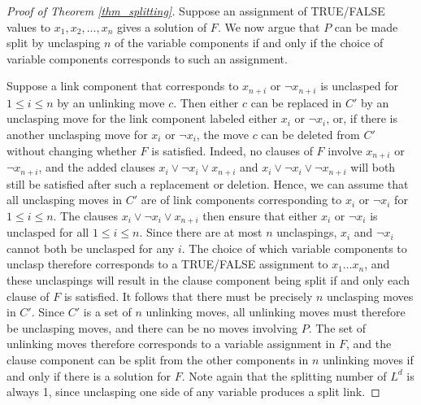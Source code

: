 \documentclass[12pt]{amsart}
\theoremstyle{definition}
\theoremstyle{remark}
\begin{document}
\begin{proof}[Proof of Theorem \ref{thm_splitting}]
Suppose an assignment of TRUE/FALSE values to $x_1, x_2, ..., x_n$ gives a solution of $F$.
We now argue that $P$ can be made split by unclasping $n$ of the variable components if and only if the choice of variable components corresponds to such an assignment.


Suppose a link component that corresponds to $x_{n+i}$ or $\neg x_{n+i}$ is unclasped for $1 \le i \le n$ by an unlinking move $c$.
Then either $c$ can be replaced in $C'$ by an unclasping move for the link component labeled either $x_i$ or $\neg x_i$, or, if there is another unclasping move for $x_i$ or $\neg x_i$, the move $c$ can be deleted from $C'$ without changing whether $F$ is satisfied.
Indeed, no clauses of $F$ involve $x_{n+i}$ or $\neg x_{n+i}$, and the added clauses $x_i \vee \neg x_i \vee x_{n+i}$ and $x_i \vee \neg x_i \vee \neg x_{n+i}$ will both still be satisfied after such a replacement or deletion.
Hence, we can assume that all unclasping moves in $C'$ are of link components corresponding to $x_i$ or $\neg x_i$ for $1 \le i \le n$.
The clauses $x_i \vee \neg x_i \vee x_{n+i}$ then ensure that either $x_i$ or $\neg x_i$ is unclasped for all $1 \le i \le n$.
Since there are at most $n$ unclaspings, $x_i$ and $\neg x_i$ cannot both be unclasped for any $i$.
The choice of which variable components to unclasp therefore corresponds to a TRUE/FALSE assignment to $x_1 \dots x_n$, and these unclaspings will result in the clause component being split if and only each clause of $F$ is satisfied.
It follows that there must be precisely $n$ unclasping moves in $C'$.
Since $C'$ is a set of $n$ unlinking moves, all unlinking moves must therefore be unclasping moves, and there can be no moves involving $P$.
The set of unlinking moves therefore corresponds to a variable assignment in $F$, and the clause component can be split from the other components in $n$ unlinking moves if and only if there is a solution for $F$.
Note again that the splitting number of $L^d$ is always 1, since unclasping one side of any variable produces a split link.


\end{proof}
\end{document}
